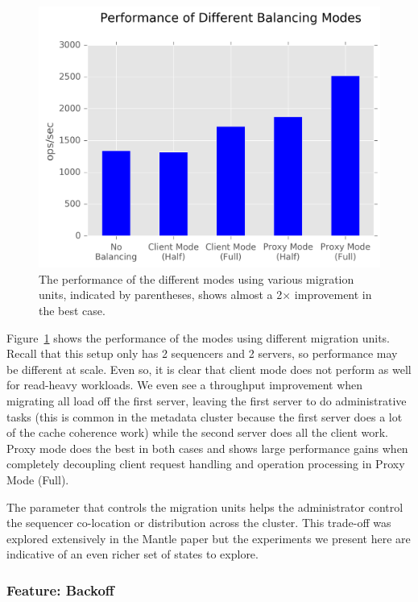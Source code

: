 \documentclass[preprint]{sigplanconf-eurosys}
\begin{document}
\begin{figure}[t!]
\centering
\includegraphics{figures/mantle-mode-performance.png}
\caption{The performance of the different modes using various migration units,
indicated by parentheses, shows almost a 2\(\times\) improvement in the best
case.  }\label{fig:mantle-mode-performance}
\end{figure}

Figure~\ref{fig:mantle-mode-performance} shows the performance of the modes
using different migration units. Recall that this setup only has 2 sequencers
and 2 servers, so performance may be different at scale. Even so, it is clear
that client mode does not perform as well for read-heavy workloads. We
even see a throughput improvement when migrating all load off the first server,
leaving the first server to do administrative tasks (this is common in the
metadata cluster because the first server does a lot of the cache coherence
work) while the second server does all the client work. Proxy mode does the
best in both cases and shows large performance gains when completely decoupling
client request handling and operation processing in Proxy Mode (Full). 

The parameter that controls the migration units helps the administrator control
the sequencer co-location or distribution across the cluster. This trade-off
was explored extensively in the Mantle paper but the experiments we present
here are indicative of an even richer set of states to explore.

\subsubsection{Feature: Backoff}
\label{sec:feature-backoff}
\end{document}
